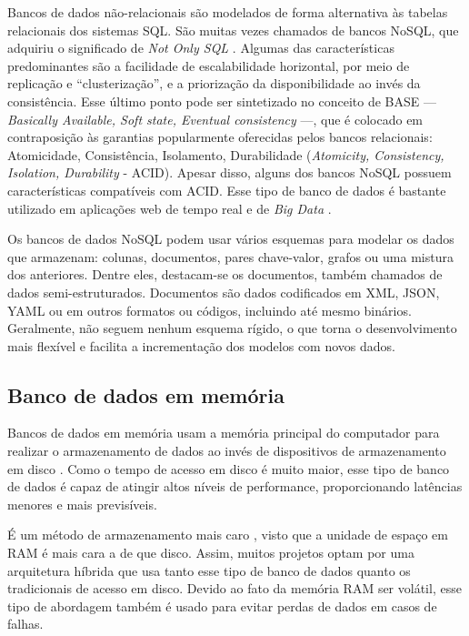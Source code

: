Bancos de dados não-relacionais são modelados de forma alternativa às tabelas relacionais dos sistemas SQL. São muitas vezes chamados de bancos NoSQL, que adquiriu o significado de \emph{Not Only SQL} \cite{nosql}. Algumas das características predominantes são a facilidade de escalabilidade horizontal, por meio de replicação e ``clusterização'', e a priorização da disponibilidade ao invés da consistência. Esse último ponto pode ser sintetizado no conceito de BASE --- \emph{Basically Available, Soft state, Eventual consistency} ---, que é colocado em contraposição às garantias popularmente oferecidas pelos bancos relacionais: Atomicidade, Consistência, Isolamento, Durabilidade (\emph{Atomicity, Consistency, Isolation, Durability} - ACID). Apesar disso, alguns dos bancos NoSQL possuem características compatíveis com ACID. Esse tipo de banco de dados é bastante utilizado em aplicações web de tempo real e de \emph{Big Data} \cite{pereira}.

Os bancos de dados NoSQL podem usar vários esquemas para modelar os dados que armazenam: colunas, documentos, pares chave-valor, grafos ou uma mistura dos anteriores. Dentre eles, destacam-se os documentos, também chamados de dados semi-estruturados. Documentos são dados codificados em XML, JSON, YAML ou em outros formatos ou códigos, incluindo até mesmo binários. Geralmente, não seguem nenhum esquema rígido, o que torna o desenvolvimento mais flexível e facilita a incrementação dos modelos com novos dados.

\subsection{Banco de dados em memória}

Bancos de dados em memória usam a memória principal do computador para realizar o armazenamento de dados ao invés de dispositivos de armazenamento em disco \cite{raima}. Como o tempo de acesso em disco é muito maior, esse tipo de banco de dados é capaz de atingir altos níveis de performance, proporcionando latências menores e mais previsíveis.

É um método de armazenamento mais caro \cite{mullins}, visto que a unidade de espaço em RAM é mais cara a de que disco. Assim, muitos projetos optam por uma arquitetura híbrida que usa tanto esse tipo de banco de dados quanto os tradicionais de acesso em disco. Devido ao fato da memória RAM ser volátil, esse tipo de abordagem também é usado para evitar perdas de dados em casos de falhas.

